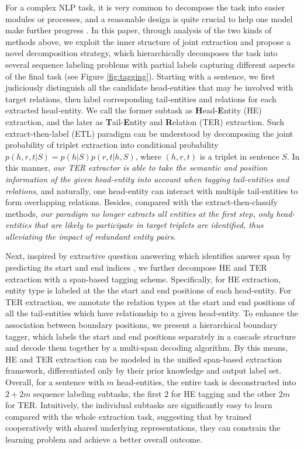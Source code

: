 \documentclass{ecai}
\begin{document}
For a complex NLP task, it is very common to decompose the task into easier modules or processes, and a reasonable design is quite crucial to help one model make further progress \cite{hu2019open,liu2018empower,zhang2019sentiment}.
In this paper, through analysis of the two kinds of methods above, we exploit the inner structure of joint extraction and propose a novel decomposition strategy, which hierarchically decomposes the task into several sequence labeling problems with partial labels capturing different aspects of the final task (see Figure \ref{fig:tagging}).
Starting with a sentence, we first judiciously distinguish all the candidate head-entities that may be involved with target relations, then label corresponding tail-entities and relations for each extracted head-entity.
We call the former subtask as \textbf{H}ead-\textbf{E}ntity (HE) extraction, and the later as \textbf{T}ail-\textbf{E}ntity and \textbf{R}elation (TER) extraction.
Such extract-then-label (ETL) paradigm can be understood by decomposing the joint probability of triplet extraction into conditional probability $p(h,r,t|S) = p(h|S)p(r,t|h,S)$, where $(h,r,t)$ is a triplet in sentence $S$. 
In this manner, \emph{our TER extractor is able to take the semantic and position information of the given head-entity into account when tagging tail-entities and relations}, and naturally, one head-entity can interact with multiple tail-entities to form overlapping relations. 
Besides, compared with the extract-then-classify methods, \emph{our paradigm no longer extracts all entities at the first step, only head-entities that are likely to participate in target triplets are identified, thus alleviating the impact of redundant entity pairs}.



Next, inspired by extractive question answering which identifies answer span by predicting its start and end indices \cite{seo2016bidirectional}, we further decompose HE and TER extraction with a span-based tagging scheme. 
Specifically, for HE extraction, entity type is labeled at the the start and end positions of each head-entity.
For TER extraction, we annotate the relation types at the start and end positions of all the tail-entities which have relationship to a given head-entity. 
To enhance the association between boundary positions, we present a hierarchical boundary tagger, which labels the start and end positions separately in a cascade structure and decode them together by a multi-span decoding algorithm.
By this means, HE and TER extraction can be modeled in the unified span-based extraction framework, differentiated only by their prior knowledge and output label set.
Overall, for a sentence with $m$ head-entities, the entire task is deconstructed into $2+2m$ sequence labeling subtasks, the first $2$ for HE tagging and the other $2m$ for TER.
Intuitively, the individual subtasks are significantly easy to learn compared with the whole extraction task, suggesting that by trained cooperatively with shared underlying representations, they can constrain the learning problem and achieve a better overall outcome.
\end{document}
